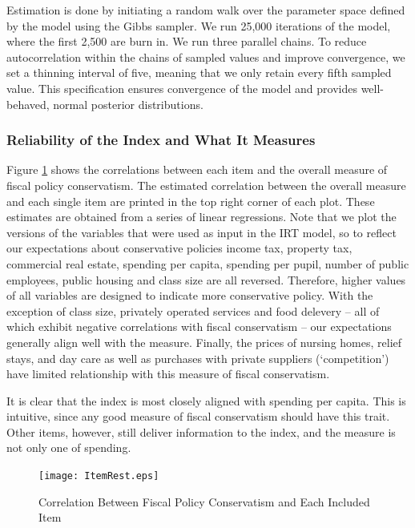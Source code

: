 \documentclass[a4paper,12pt]{article}
\begin{document}
Estimation is done by initiating a random walk over the parameter space defined by the model using the Gibbs sampler. We run 25,000 iterations of the model, where the first 2,500 are burn in. We run three parallel chains. To reduce autocorrelation within the chains of sampled values and improve convergence, we set a thinning interval of five, meaning that we only retain every fifth sampled value. This specification ensures  convergence of the model and provides well-behaved, normal posterior distributions.

\subsubsection*{Reliability of the Index and What It Measures}

Figure \ref{fig:ItemRest} shows the correlations between each item and the overall measure of fiscal policy conservatism. The estimated correlation between the overall measure and each single item are printed in the top right corner of each plot. These estimates are obtained from a series of linear regressions. Note that we plot the versions of the variables that were used as input in the IRT model, so to reflect our expectations about conservative policies income tax, property tax, commercial real estate, spending per capita, spending per pupil, number of public employees, public housing and class size are all reversed. Therefore, higher values of all variables are designed to indicate more conservative policy. With the exception of class size, privately operated services and food delevery -- all of which exhibit negative correlations with fiscal conservatism -- our expectations generally align well with the measure. Finally, the prices of nursing homes, relief stays, and day care as well as purchases with private suppliers (`competition') have limited relationship with this measure of fiscal conservatism. 

It is clear that the index is most closely aligned with spending per capita. This is intuitive, since any good measure of fiscal conservatism should have this trait. Other items, however, still deliver information to the index, and the measure is not only one of spending. 



\begin{figure}[htbp]
	\centering 
	
	\texttt{[image: ItemRest.eps]}
	\caption{Correlation Between Fiscal Policy Conservatism and Each Included Item}
	\label{fig:ItemRest}
	
\end{figure}
\end{document}
